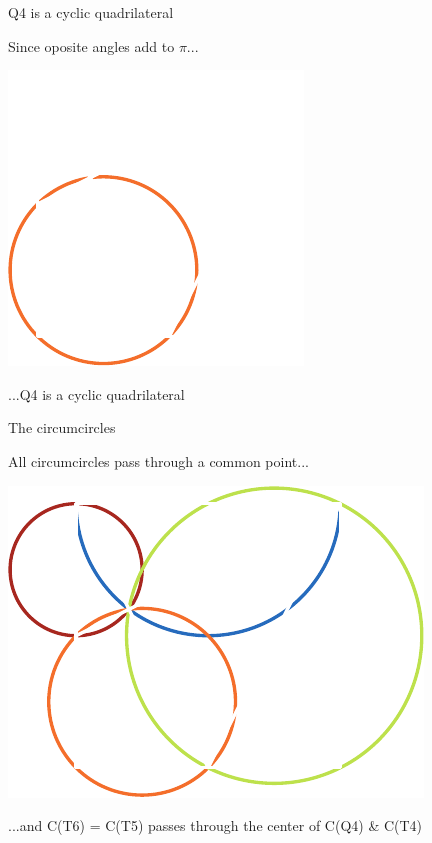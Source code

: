 \documentclass[14pt]{beamer}
\begin{document}

    \begin{frame}{Q4 is a cyclic quadrilateral}
        \begin{center}
            Since oposite angles add to $\pi$...
        \end{center}
        \vspace{0.90em}
        \hspace{5.25em} \includegraphics[scale=1.]{figures/figure019b.pdf} \\
        \begin{center}
            ...Q4 is a cyclic quadrilateral
        \end{center}
    \end{frame}


    \begin{frame}{The circumcircles}
        \begin{center}
            All circumcircles pass through a common point...
        \end{center}
        \hspace{3.92em} \includegraphics[scale=1.0]{figures/figure019c.pdf} \\
        \begin{center}
            \footnotesize ...and C(T6) = C(T5) passes through the center of C(Q4) \& C(T4)
        \end{center}
    \end{frame}
\end{document}
